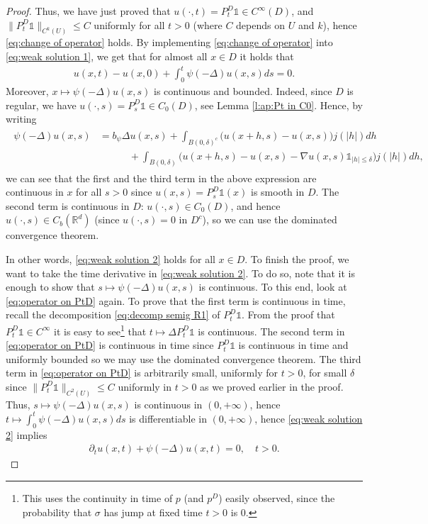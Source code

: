 \documentclass[reqno]{amsart}
\theoremstyle{remark}
\numberwithin{equation}{section} %
\newcommand{\Lpsi}{\psi(-\Delta)}
\newcommand{\1}{\mathds{1}}
\begin{document}
\begin{proof}
		Thus, we have just proved that $u(\cdot,t)= P_t^D\mathds{1}\in C^\infty(D)$, and $\|  P^D_t\mathds{1}\|_{C^k(U)}\le C$ uniformly for all $t>0$ (where $C$ depends on $U$ and $k$),  hence \eqref{eq:change of operator} holds. By implementing \eqref{eq:change of operator} into \eqref{eq:weak solution 1}, we get that for almost all $x\in D$ it holds that
		\begin{align}\label{eq:weak solution 2}
			u(x,t)-u(x,0)+\int_0^t \Lpsi u(x,s)ds=0.
		\end{align}
		Moreover, $x\mapsto\Lpsi u(x,s)$ is continuous and bounded. Indeed, since $D$ is regular, we have $u(\cdot,s)= P^D_s\mathds{1}\in C_0(D)$, see Lemma \ref{l:ap:Pt in C0}. Hence, by writing
		\begin{align}
			\begin{split}\label{eq:operator on PtD}
				\Lpsi u(x,s)&=b_\psi\Delta u(x,s)+\int_{B(0,\delta)^c}\big(u(x+h,s)-u(x,s)\big)j(|h|)dh\\
				&\hspace{3em}+\int_{B(0,\delta)}\big(u(x+h,s)-u(x,s)-\nabla u(x,s)\mathds{1}_{|h|\le \delta}\big)j(|h|)dh,
			\end{split}
		\end{align}
		we can see that the first and the third term in the above expression are continuous in $x$ for all $s>0$ since $u(x,s)= P^D_s\mathds{1}(x)$ is smooth in $D$. The second term is continuous in $D$: $u(\cdot,s)\in C_0(D)$, and hence $u(\cdot,s)\in C_b(\mathbb{R}^d)$ (since $u(\cdot,s)=0$ in $D^c$), so we can use the dominated convergence theorem. 
		
		In other words, \eqref{eq:weak solution 2} holds for all $x\in D$. To finish the proof, we want to take the time derivative in \eqref{eq:weak solution 2}. To do so, note that it is enough to show that $s\mapsto \Lpsi u(x,s)$ is continuous. To this end, look at \eqref{eq:operator on PtD} again. To prove that the first term is continuous in time, recall the decomposition \eqref{eq:decomp semig R1} of $ P_t^D\mathds{1}$. From the proof that $ P_t^D\mathds{1}\in C^\infty$ it is easy to see\footnote{This uses the continuity in time of $p$ (and $p^D$) easily observed, since the probability that $\sigma$ has jump at fixed time $t>0$ is 0.} that $t\mapsto \Delta  P_t^D\mathds{1}$ is continuous. The second term in \eqref{eq:operator on PtD} is continuous in time since $ P_t^D\mathds{1}$ is continuous in time and uniformly  bounded so we may use the dominated convergence theorem. The third term in \eqref{eq:operator on PtD} is arbitrarily small, uniformly for $t>0$, for small $\delta$ since $\| P_t^D\mathds{1}\|_{C^2(U)}\le C$ uniformly in $t>0$ as we proved earlier in the proof. Thus, $s\mapsto \Lpsi u(x,s)$ is continuous in $(0,+\infty)$, hence $t\mapsto \int_0^t \Lpsi u(x,s)ds$ is differentiable in $(0,+\infty)$, hence \eqref{eq:weak solution 2} implies
		\begin{align*}
			\partial_t u(x,t)+\Lpsi u(x,t)=0,\quad t>0.
		\end{align*}
	\end{proof}
	
\end{document}
